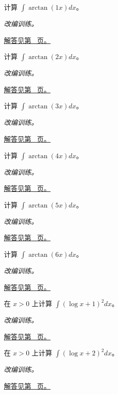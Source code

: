 \documentclass[UTF8,12pt,a4paper,fontset=fandol]{ctexart}
\begin{document}
\begin{example}[反三角函数的分部积分]\label{ex:c15q7}
计算 $\int\arctan(1x)dx$。
\par\textit{改编训练。}\par\hyperref[ans:c15q7]{解答见第~\pageref{ans:c15q7} 页。}
\end{example}
\begin{example}[反三角函数的分部积分]\label{ex:c15q8}
计算 $\int\arctan(2x)dx$。
\par\textit{改编训练。}\par\hyperref[ans:c15q8]{解答见第~\pageref{ans:c15q8} 页。}
\end{example}
\begin{example}[反三角函数的分部积分]\label{ex:c15q9}
计算 $\int\arctan(3x)dx$。
\par\textit{改编训练。}\par\hyperref[ans:c15q9]{解答见第~\pageref{ans:c15q9} 页。}
\end{example}
\begin{example}[反三角函数的分部积分]\label{ex:c15q10}
计算 $\int\arctan(4x)dx$。
\par\textit{改编训练。}\par\hyperref[ans:c15q10]{解答见第~\pageref{ans:c15q10} 页。}
\end{example}
\begin{example}[反三角函数的分部积分]\label{ex:c15q11}
计算 $\int\arctan(5x)dx$。
\par\textit{改编训练。}\par\hyperref[ans:c15q11]{解答见第~\pageref{ans:c15q11} 页。}
\end{example}
\begin{example}[反三角函数的分部积分]\label{ex:c15q12}
计算 $\int\arctan(6x)dx$。
\par\textit{改编训练。}\par\hyperref[ans:c15q12]{解答见第~\pageref{ans:c15q12} 页。}
\end{example}
\begin{example}[对数平方的分部积分]\label{ex:c15q13}
在 $x>0$ 上计算 $\displaystyle\int(\log x+1)^2dx$。
\par\textit{改编训练。}\par\hyperref[ans:c15q13]{解答见第~\pageref{ans:c15q13} 页。}
\end{example}
\begin{example}[对数平方的分部积分]\label{ex:c15q14}
在 $x>0$ 上计算 $\displaystyle\int(\log x+2)^2dx$。
\par\textit{改编训练。}\par\hyperref[ans:c15q14]{解答见第~\pageref{ans:c15q14} 页。}
\end{example}
\end{document}
